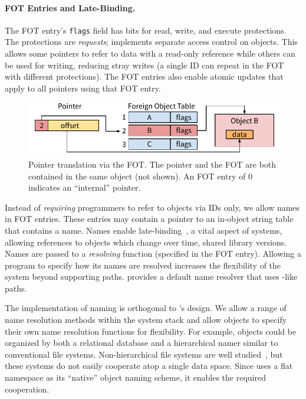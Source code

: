 {    \paragraph{FOT Entries and Late-Binding.}

    The FOT entry's \texttt{flags} field has bits for read, write, and execute protections. The
    protections are \textit{requests}; \Twizzler implements separate access control on objects.
    This allows some pointers to refer to data with a read-only reference while others can be used for
    writing, reducing stray writes (a single ID can repeat in the FOT with different protections).
    The FOT entries also enable atomic updates that apply to all pointers using
    that FOT entry.

    \begin{figure}
        \includegraphics[width=\linewidth]{fig/ptrfot}
        \caption{Pointer translation via the FOT\@.
            The pointer and the FOT
            are both contained in the same object (not shown). An FOT entry of $0$ indicates an ``internal''
            pointer.
        }
        \label{fig:fottran}
    \end{figure}

    Instead of \emph{requiring} programmers to refer to objects via IDs only, we allow
    names in FOT entries. These entries may contain a pointer to an
    in-object string table that contains a name.
    Names enable late-binding~\cite{daley:cacm68}, a
    vital aspect of systems, allowing references to objects which change over time, \eg shared library versions.
    Names are passed to a \textit{resolving} function (specified in the FOT entry).
    Allowing a program to specify how its names are resolved
    increases the flexibility of the system beyond supporting \unix paths. \Twizzler
    provides a default name resolver that uses \unix-like paths.%

    The implementation of naming is orthogonal to \Twizzler's design. We
    allow a range of name resolution methods within the system stack
    and allow objects to specify their own name resolution functions for flexibility. For example,
    objects could be organized by both a relational database and a hierarchical namer
    similar to conventional file systems. Non-hierarchical file systems
    are well studied~\cite{gifford:sosp91, ames:mss06, padioleau:usenix03, gopal:osdi99,
        parkerwood:systor14}, but these systems do not easily cooperate atop a single data space.
    Since \Twizzler uses a flat namespace as its ``native'' object naming scheme, it
    enables the required cooperation.

}


